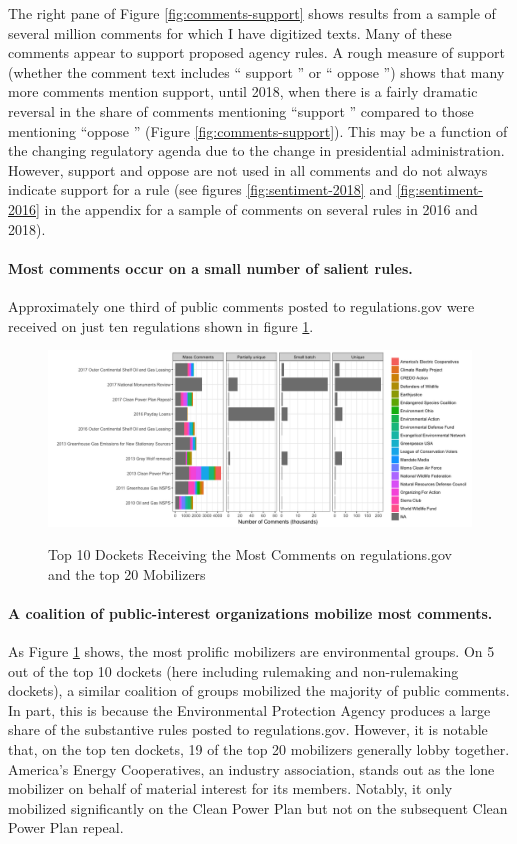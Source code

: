 The right pane of Figure \ref{fig:comments-support} shows results from a sample of several million comments for which I have digitized texts. Many of these comments appear to support proposed agency rules. A rough measure of support (whether the comment text includes `` support '' or `` oppose '') shows that many more comments mention support, until 2018, when there is a fairly dramatic reversal in the share of comments mentioning ``support '' compared to those mentioning ``oppose '' (Figure \ref{fig:comments-support}). This may be a function of the changing regulatory agenda due to the change in presidential administration. However, support and oppose are not used in all comments and do not always indicate support for a rule (see figures \ref{fig:sentiment-2018} and \ref{fig:sentiment-2016} in the appendix for a sample of comments on several rules in 2016 and 2018). 


\paragraph{Most comments occur on a small number of salient rules.} Approximately one third of public comments posted to regulations.gov were received on just ten regulations shown in figure \ref{fig:topdockets}.


\begin{figure}[h!]
    \centering
        \caption{Top 10 Dockets Receiving the Most Comments on regulations.gov and the top 20 Mobilizers}
    \includegraphics[width = 6in]{Figs/topdockets.png}
    \label{fig:topdockets}
\end{figure}

\paragraph{A coalition of public-interest organizations mobilize most comments.} As Figure \ref{fig:topdockets} %
shows, the most prolific mobilizers are environmental groups. On 5 out of the top 10 dockets (here including rulemaking and non-rulemaking dockets), a similar coalition of groups mobilized the majority of public comments. In part, this is because the Environmental Protection Agency produces a large share of the substantive rules posted to regulations.gov. However, it is notable that, on the top ten dockets, 19 of the top 20 mobilizers generally lobby together. America's Energy Cooperatives, an industry association, stands out as the lone mobilizer on behalf of material interest for its members. Notably, it only mobilized significantly on the Clean Power Plan but not on the subsequent Clean Power Plan repeal. 